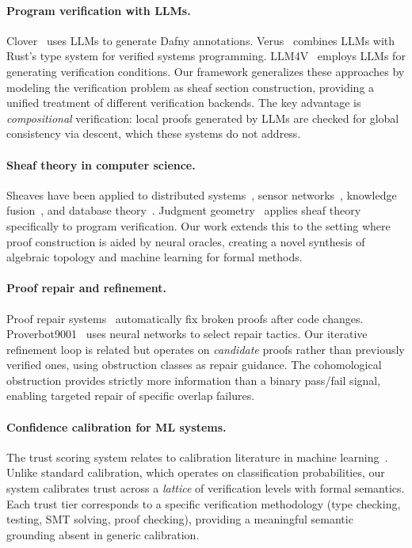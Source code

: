 \documentclass[11pt]{article}
\begin{document}
\paragraph{Program verification with LLMs.}
Clover~\cite{Sun2024} uses LLMs to generate Dafny annotations.
Verus~\cite{Lattuada2023} combines LLMs with Rust's type system for
verified systems programming.  LLM4V~\cite{Chakraborty2023} employs
LLMs for generating verification conditions.  Our framework
generalizes these approaches by modeling the verification problem as
sheaf section construction, providing a unified treatment of different
verification backends.  The key advantage is \emph{compositional}
verification: local proofs generated by LLMs are checked for global
consistency via descent, which these systems do not address.

\paragraph{Sheaf theory in computer science.}
Sheaves have been applied to distributed systems~\cite{Robinson2014},
sensor networks~\cite{Ghrist2007}, knowledge
fusion~\cite{Goguen1992}, and database theory~\cite{Abramsky2011}.
Judgment geometry~\cite{JuGeo2024} applies sheaf theory specifically
to program verification.  Our work extends this to the setting where
proof construction is aided by neural oracles, creating a novel
synthesis of algebraic topology and machine learning for formal
methods.

\paragraph{Proof repair and refinement.}
Proof repair systems~\cite{Ringer2021} automatically fix broken
proofs after code changes.  Proverbot9001~\cite{Sanchez2020} uses
neural networks to select repair tactics.  Our iterative refinement
loop is related but operates on \emph{candidate} proofs rather than
previously verified ones, using obstruction classes as repair guidance.
The cohomological obstruction provides strictly more information than
a binary pass/fail signal, enabling targeted repair of specific
overlap failures.

\paragraph{Confidence calibration for ML systems.}
The trust scoring system relates to calibration literature in
machine learning~\cite{Guo2017}.  Unlike standard calibration, which
operates on classification probabilities, our system calibrates trust
across a \emph{lattice} of verification levels with formal semantics.
Each trust tier corresponds to a specific verification methodology
(type checking, testing, SMT solving, proof checking), providing
a meaningful semantic grounding absent in generic calibration.
\end{document}
